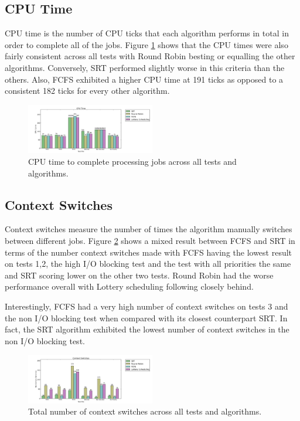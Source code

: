 \documentclass{acm_proc_article-sp}
\begin{document}
\subsection{CPU Time}
CPU time is the number of CPU ticks that each algorithm performs in total in order to complete all of the jobs. Figure \ref{fig:cpu-time} shows that the CPU times were also fairly consistent across all tests with Round Robin besting or equalling the other algorithms. Conversely, SRT performed slightly worse in this criteria than the others. Also, FCFS exhibited a higher CPU time at 191 ticks as opposed to a consistent 182 ticks for every other algorithm. 

\begin{figure}[H]
\centering
\includegraphics[width=0.5\textwidth]{cpu_time.png}
\caption{CPU time to complete processing jobs across all tests and algorithms.}
\label{fig:cpu-time}
\end{figure}

\subsection{Context Switches}
Context switches measure the number of times the algorithm manually switches between different jobs. Figure \ref{fig:ctex-switches} shows a mixed result between FCFS and SRT in terms of the number context switches made with FCFS having the lowest result on tests 1,2, the high I/O blocking test and the test with all priorities the same and SRT scoring lower on the other two tests. Round Robin had the worse performance overall with Lottery scheduling following closely behind. 

Interestingly, FCFS had a very high number of context switches on tests 3 and the non I/O blocking test when compared with its closest counterpart SRT. In fact, the SRT algorithm exhibited the lowest number of context switches in the non I/O blocking test.

\begin{figure}[H]
\centering
\includegraphics[width=0.5\textwidth]{ctex_switches.png}
\caption{Total number of context switches across all tests and algorithms.}
\label{fig:ctex-switches}
\end{figure}
\end{document}
